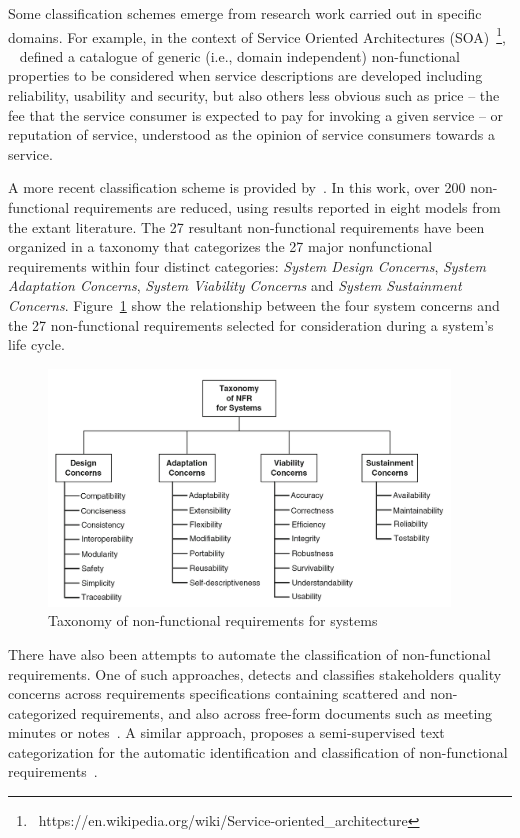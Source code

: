 \documentclass[dissertation,final]{softeng}
\begin{document}
{Some classification schemes emerge from research work carried out in specific domains. For example, in the context of Service Oriented Architectures (SOA)~\footnote{~https://en.wikipedia.org/wiki/Service-oriented\_architecture}, ~\citet{Hanane2012} defined a catalogue of generic (i.e., domain independent) non-functional properties to be considered when service descriptions are developed including reliability, usability and security, but also others less obvious such as price -- the fee that the service consumer is expected to pay for invoking a given service -- or reputation of service, understood as the opinion of service consumers towards a service.

A more recent classification scheme is provided by~\citet{adams2015non}. In this work, over 200 non-functional requirements are reduced, using results reported in eight models from the extant literature. The 27 resultant non-functional requirements have been organized in a taxonomy that categorizes the 27 major nonfunctional requirements within four distinct categories: \emph{System Design Concerns}, \emph{System Adaptation Concerns}, \emph{System Viability Concerns} and \emph{System Sustainment Concerns}. Figure~\ref{fig:nfrs_in_systems_design} show the relationship between the four system concerns and the 27 non-functional requirements selected for consideration during a system's life cycle.

\begin{figure}[h]
\includegraphics[width=0.95\textwidth]{nfrs_in_systems_design}
\centering
\caption[Taxonomy of non-functional requirements for systems]{Taxonomy of non-functional requirements for systems~\citep{adams2015non}}
\label{fig:nfrs_in_systems_design}
\end{figure}

There have also been attempts to automate the classification of non-functional requirements. One of such approaches, detects and classifies stakeholders quality concerns across requirements specifications containing scattered and non-categorized requirements, and also across free-form documents such as meeting minutes or notes~\citep{Cleland-Huang:2007}. A similar approach, proposes a semi-supervised text categorization for the automatic identification and classification of non-functional requirements~\citep{Casamayor:2010}.

}
\end{document}
